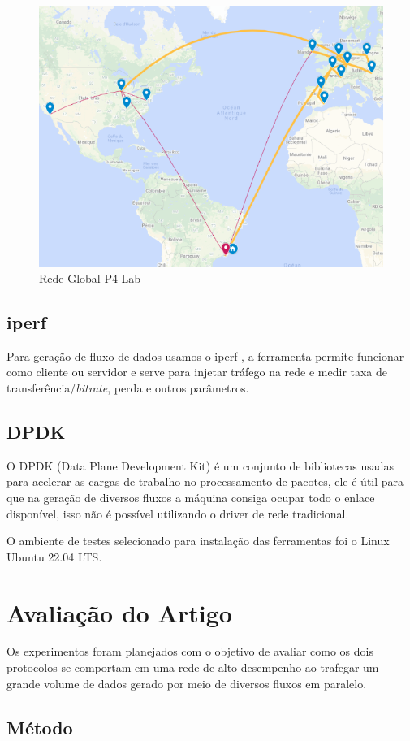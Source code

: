 \documentclass[12pt]{article}
\begin{document}
\begin{figure}[ht]
\centering
\includegraphics[width=.5\textwidth]{p4lab.png}
\caption{Rede Global P4 Lab}
\label{fig:p4lab}
\end{figure}

\subsection{iperf}

Para geração de fluxo de dados usamos o iperf \cite{esnet}, a ferramenta permite funcionar como cliente ou servidor e serve para injetar tráfego na rede e medir taxa de transferência/\textit{bitrate}, perda e outros parâmetros.

\subsection{DPDK}

O DPDK (Data Plane Development Kit) é um conjunto de bibliotecas usadas para acelerar as cargas de trabalho no processamento de pacotes, ele é útil para que na geração de diversos fluxos a máquina consiga ocupar todo o enlace disponível, isso não é possível utilizando o driver de rede tradicional.


O ambiente de testes selecionado para instalação das ferramentas foi o Linux Ubuntu 22.04 LTS.

\section{Avaliação do Artigo}

Os experimentos foram planejados com o objetivo de avaliar como os dois protocolos se comportam em uma rede de alto desempenho ao trafegar um grande volume de dados gerado por meio de diversos fluxos em paralelo.

\subsection{Método}
\end{document}
